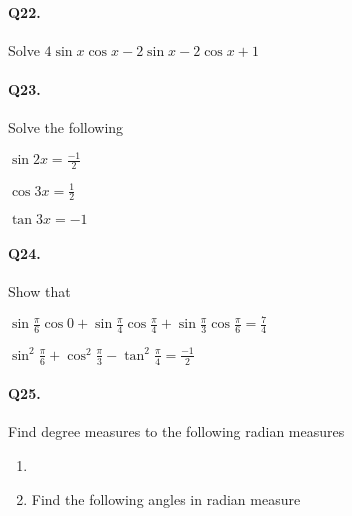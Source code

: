 \documentclass{article}
\begin{document}
\paragraph{Q22.}
Solve $4\sin x\cos x - 2\sin x - 2\cos x + 1$

\paragraph{Q23.}
Solve the following

\begin{enumerate*}[label=\alph*)]
  \item $\sin 2x = \frac{-1}{2}$
  \item $\cos 3x = \frac{1}{2}$
  \item $\tan 3x = -1$
\end{enumerate*}

\paragraph{Q24.}
Show that

\begin{enumerate*}[label=\alph*)]
  \item $\sin \frac{\pi}{6} \cos 0 + \sin \frac{\pi}{4} \cos \frac{\pi}{4} + \sin \frac{\pi}{3} \cos \frac{\pi}{6} = \frac{7}{4}$
  \item $\sin^{2} \frac{\pi}{6} + \cos^{2} \frac{\pi}{3} - \tan^{2} \frac{\pi}{4} = \frac{-1}{2}$
\end{enumerate*}

\paragraph{Q25.}
Find degree measures to the following radian measures
\begin{enumerate}[label=\alph*)]
  \item
  \item Find the following angles in radian measure
\end{enumerate}
\end{document}
